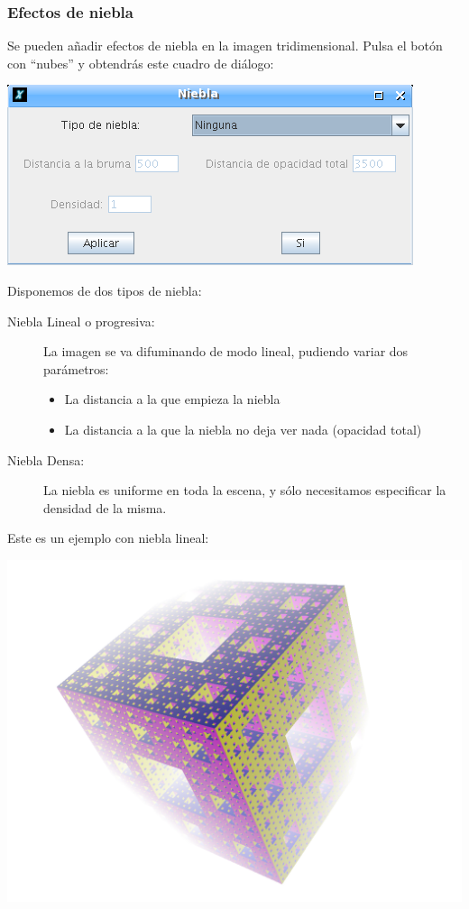 \subsubsection*{Efectos de niebla}

Se pueden a\~nadir efectos de niebla en la imagen tridimensional. Pulsa el bot\'on
con ``nubes'' y obtendr\'as este cuadro de di\'alogo:
\begin{center}
   \includegraphics[scale=0.3]{Imagenes/05_Primitivas/Niebla.png}
\end{center}
Disponemos de dos tipos de niebla:
\begin{description}
   \item[Niebla Lineal o progresiva:] La imagen se va difuminando de modo lineal,
      pudiendo variar dos par\'ametros:
      \begin{itemize}
         \item La distancia a la que empieza la niebla 
         \item La distancia a la que la niebla no deja ver nada (opacidad total)
      \end{itemize}
   \item[Niebla Densa:] La niebla es uniforme en toda la escena, y s\'olo necesitamos
      especificar la densidad de la misma.
\end{description}
Este es un ejemplo con niebla lineal:
\begin{center}
   \includegraphics[scale=0.2]{Imagenes/05_Primitivas/EjemploNiebla.png}
\end{center}

